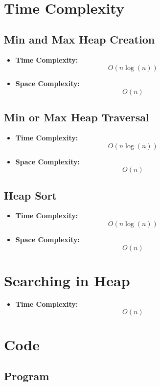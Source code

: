 \documentclass[11pt]{article}
\begin{document}
\section{Time Complexity}

\subsection{Min and Max Heap Creation}
\begin{itemize}
    \item \textbf{Time Complexity:} \[ O(n\log(n))\]
    \item \textbf{Space Complexity:} \[ O(n) \]
\end{itemize}

\subsection{Min or Max Heap Traversal}

\begin{itemize}
    \item \textbf{Time Complexity:} \[ O(n\log(n))\]
    \item \textbf{Space Complexity:} \[ O(n) \]
\end{itemize}

\subsection{Heap Sort}

\begin{itemize}
    \item \textbf{Time Complexity:} \[ O(n\log(n))\]
    \item \textbf{Space Complexity:} \[ O(n) \]
\end{itemize}

\section{Searching in Heap}

\begin{itemize}
    \item \textbf{Time Complexity:} \[ O(n) \]
\end{itemize}

\section{Code}

\subsection{Program}

\end{document}
